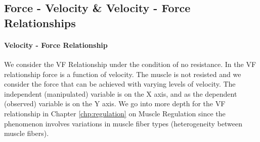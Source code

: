 
\subsection{Force - Velocity \& Velocity - Force Relationships}

\paragraph{Velocity - Force Relationship}
We consider the VF Relationship under the condition of no resistance. In the VF relationship force is a function of velocity. The muscle is not resisted \footnotemark{} and we consider the force that can be achieved with varying levels of velocity. The independent (manipulated) variable is on the X axis, and as the dependent (observed) variable is on the Y axis. We go into more depth for the VF relationship in Chapter \ref{chp:regulation} on Muscle Regulation since the phenomenon involves variations in muscle fiber types (heterogeneity between muscle fibers).

